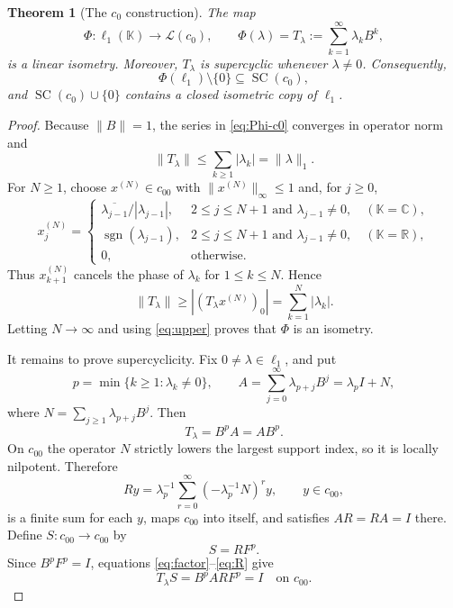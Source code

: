 \documentclass[11pt]{article}
\newtheorem{theorem}{Theorem}
\newcommand{\K}{\mathbb K}
\newcommand{\SC}{\operatorname{SC}}
\newcommand{\Lcal}{\mathcal L}
\begin{document}
\begin{theorem}[The $c_0$ construction]\label{thm:c0}
The map
\begin{equation}\label{eq:Phi-c0}
 \Phi:\ell_1(\K)\longrightarrow\Lcal(c_0),
 \qquad
 \Phi(\lambda)=T_\lambda:=\sum_{k=1}^{\infty}\lambda_kB^k,
\end{equation}
is a linear isometry. Moreover, $T_\lambda$ is supercyclic whenever
$\lambda\neq0$. Consequently,
\[
 \Phi(\ell_1)\setminus\{0\}\subseteq\SC(c_0),
\]
and $\SC(c_0)\cup\{0\}$ contains a closed isometric copy of $\ell_1$.
\end{theorem}

\begin{proof}
Because $\|B\|=1$, the series in \eqref{eq:Phi-c0} converges in operator
norm and
\begin{equation}\label{eq:upper}
 \|T_\lambda\|\leq\sum_{k\geq1}|\lambda_k|=\|\lambda\|_1.
\end{equation}
For $N\geq1$, choose $x^{(N)}\in c_{00}$ with $\|x^{(N)}\|_\infty\leq1$
and, for $j\geq0$,
\[
 x^{(N)}_{j}=\begin{cases}
  \overline{\lambda_{j-1}}/|\lambda_{j-1}|,&
       2\leq j\leq N+1\text{ and }\lambda_{j-1}\neq0,
       \quad(\K=\mathbb C),\\
  \operatorname{sgn}(\lambda_{j-1}),&
       2\leq j\leq N+1\text{ and }\lambda_{j-1}\neq0,
       \quad(\K=\mathbb R),\\
  0,&\text{otherwise}.
 \end{cases}
\]
Thus $x^{(N)}_{k+1}$ cancels the phase of $\lambda_k$ for
$1\leq k\leq N$. Hence
\[
 \|T_\lambda\|\geq |(T_\lambda x^{(N)})_0|
   =\sum_{k=1}^N|\lambda_k|.
\]
Letting $N\to\infty$ and using \eqref{eq:upper} proves that $\Phi$ is an
isometry.

It remains to prove supercyclicity. Fix $0\neq\lambda\in\ell_1$, and put
\[
 p=\min\{k\geq1:\lambda_k\neq0\},
 \qquad
 A=\sum_{j=0}^{\infty}\lambda_{p+j}B^j=\lambda_pI+N,
\]
where $N=\sum_{j\geq1}\lambda_{p+j}B^j$. Then
\begin{equation}\label{eq:factor}
 T_\lambda=B^pA=AB^p.
\end{equation}
On $c_{00}$ the operator $N$ strictly lowers the largest support index, so it
is locally nilpotent. Therefore
\begin{equation}\label{eq:R}
 R y=\lambda_p^{-1}
   \sum_{r=0}^{\infty}(-\lambda_p^{-1}N)^r y,
 \qquad y\in c_{00},
\end{equation}
is a finite sum for each $y$, maps $c_{00}$ into itself, and satisfies
$AR=RA=I$ there. Define $S:c_{00}\to c_{00}$ by
\[
 S=RF^p.
\]
Since $B^pF^p=I$, equations \eqref{eq:factor}--\eqref{eq:R} give
\begin{equation}\label{eq:rightinverse}
 T_\lambda S=B^pARF^p=I\quad\text{on }c_{00}.
\end{equation}


\end{proof}
\end{document}
